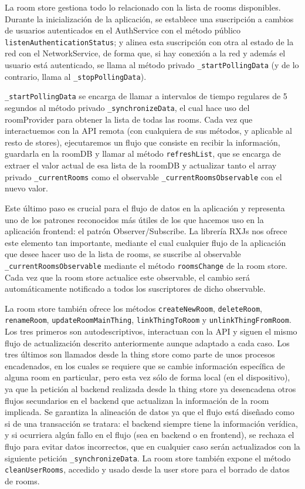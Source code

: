 \vspace{0.5cm}

La room store gestiona todo lo relacionado con la lista de rooms disponibles. Durante la inicialización de la aplicación, se establece una suscripción a cambios de usuarios autenticados en el AuthService con el método público \verb|listenAuthenticationStatus|; y alinea esta suscripción con otra al estado de la red con el NetworkService, de forma que, si hay conexión a la red y además el usuario está autenticado, se llama al método privado \verb|_startPollingData| (y de lo contrario, llama al \verb|_stopPollingData|).

\verb|_startPollingData| se encarga de llamar a intervalos de tiempo regulares de 5 segundos al método privado \verb|_synchronizeData|, el cual hace uso del roomProvider para obtener la lista de todas las rooms. Cada vez que interactuemos con la API remota (con cualquiera de sus métodos, y aplicable al resto de stores), ejecutaremos un flujo que consiste en recibir la información, guardarla en la roomDB y llamar al método \verb|refreshList|, que se encarga de extraer el valor actual de esa lista de la roomDB y actualizar tanto el array privado \verb|_currentRooms| como el observable \verb|_currentRoomsObservable| con el nuevo valor.

Este último paso es crucial para el flujo de datos en la aplicación y representa uno de los patrones reconocidos más útiles de los que hacemos uso en la aplicación frontend: el patrón Observer/Subscribe. La librería RXJs nos ofrece este elemento tan importante, mediante el cual cualquier flujo de la aplicación que desee hacer uso de la lista de rooms, se suscribe al observable \verb|_currentRoomsObservable| mediante el método \verb|roomsChange| de la room store. Cada vez que la room store actualice este observable, el cambio será automáticamente notificado a todos los suscriptores de dicho observable.

La room store también ofrece los métodos \verb|createNewRoom|, \verb|deleteRoom|, \verb|renameRoom|, \verb|updateRoomMainThing|, \verb|linkThingToRoom| y \verb|unlinkThingFromRoom|. Los tres primeros son autodescriptivos, interactuan con la API y siguen el mismo flujo de actualización descrito anteriormente aunque adaptado a cada caso. Los tres últimos son llamados desde la thing store como parte de unos procesos encadenados, en los cuales se requiere que se cambie información específica de alguna room en particular, pero esta vez sólo de forma local (en el dispositivo), ya que la petición al backend realizada desde la thing store ya desencadena otros flujos secundarios en el backend que actualizan la información de la room implicada. Se garantiza la alineación de datos ya que el flujo está diseñado como si de una transacción se tratara: el backend siempre tiene la información verídica, y si ocurriera algún fallo en el flujo (sea en backend o en frontend), se rechaza el flujo para evitar datos incorrectos, que en cualquier caso serán actualizados con la siguiente petición \verb|_synchronizeData|. 
La room store también expone el método \verb|cleanUserRooms|, accedido y usado desde la user store para el borrado de datos de rooms.

